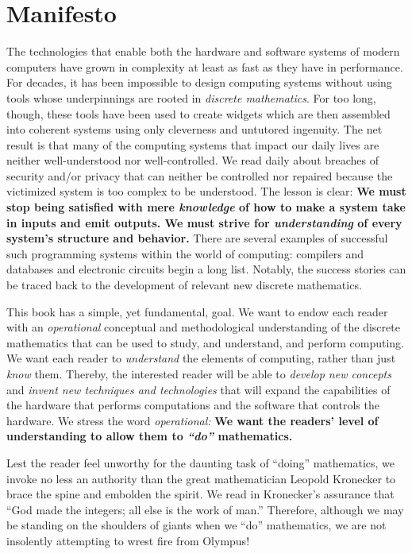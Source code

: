 
\chapter*{Manifesto}

The technologies that enable both the hardware and software systems of modern computers have grown in complexity at least as fast as they have in performance.  For decades, it has been impossible to design computing systems without using tools whose underpinnings are rooted
in {\it discrete mathematics}.  For too long, though, these tools have been used to create widgets which are then assembled into coherent systems using only cleverness and untutored ingenuity.  The net result is that many of the computing systems that impact our daily lives are neither well-understood nor well-controlled.  We read daily about breaches of security and/or privacy that can neither be controlled nor repaired because the victimized system is too complex to be understood.  The lesson is clear: {\bf We must stop being satisfied with mere {\em knowledge} of how to make a system take in inputs and emit outputs.  We must strive for {\em understanding} of every system's structure and behavior.}  There are several examples of successful such programming systems within the world of computing: compilers and databases and electronic circuits begin a long list.  Notably, the success stories can be traced back to the development of relevant new discrete mathematics.

This book has a simple, yet fundamental, goal.  We want to endow each reader with an {\em operational} conceptual and methodological understanding of the discrete mathematics that can be used to study, and understand, and perform computing.  We want each reader to {\em understand} the elements of computing, rather than just {\em know} them.  Thereby, the interested reader will be able to {\em develop new concepts} and {\em invent new techniques and technologies} that will expand the capabilities of the hardware that performs computations and the software that controls the hardware.  We stress the word {\it operational:}  {\bf We want the readers' level of understanding to allow them to {\em ``do''} mathematics.}

\bigskip

Lest the reader feel unworthy for the daunting task of ``doing'' mathematics, we invoke no less an authority than the great mathematician Leopold Kronecker to brace
the spine and embolden the spirit.  We read in \cite{Bell86} Kronecker's assurance that ``God made the integers; all else is the work of man.''  Therefore, although we may be standing on the
shoulders of giants when we ``do'' mathematics, we are not insolently attempting to wrest fire from Olympus!

